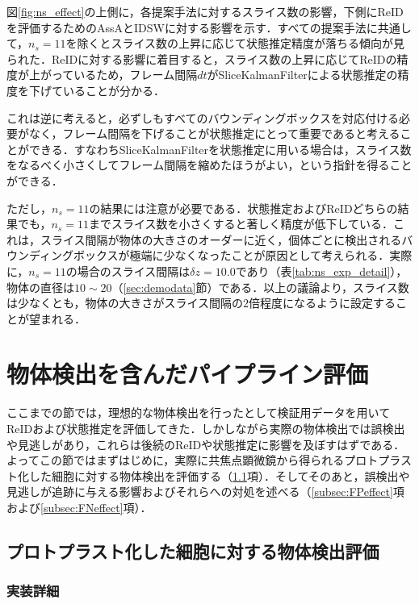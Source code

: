     図\ref{fig:ns_effect}の上側に，各提案手法に対するスライス数の影響，下側にReIDを評価するためのAssAとIDSWに対する影響を示す．すべての提案手法に共通して，$n_s = 11$を除くとスライス数の上昇に応じて状態推定精度が落ちる傾向が見られた．ReIDに対する影響に着目すると，スライス数の上昇に応じてReIDの精度が上がっているため，フレーム間隔$dt$がSliceKalmanFilterによる状態推定の精度を下げていることが分かる．

    これは逆に考えると，必ずしもすべてのバウンディングボックスを対応付ける必要がなく，フレーム間隔を下げることが状態推定にとって重要であると考えることができる．すなわちSliceKalmanFilterを状態推定に用いる場合は，スライス数をなるべく小さくしてフレーム間隔を縮めたほうがよい，という指針を得ることができる．

    ただし，$n_s = 11$の結果には注意が必要である．状態推定およびReIDどちらの結果でも，$n_s = 11$までスライス数を小さくすると著しく精度が低下している．これは，スライス間隔が物体の大きさのオーダーに近く，個体ごとに検出されるバウンディングボックスが極端に少なくなったことが原因として考えられる．実際に，$n_s = 11$の場合のスライス間隔は$\delta z = 10.0$であり（表\ref{tab:ns_exp_detail}），物体の直径は$10 \sim 20$（\ref{sec:demodata}節）である．以上の議論より，スライス数は少なくとも，物体の大きさがスライス間隔の$2$倍程度になるように設定することが望まれる．

\section{物体検出を含んだパイプライン評価}
\label{sec:pipleline_evaluation_with_detection}

ここまでの節では，理想的な物体検出を行ったとして検証用データを用いてReIDおよび状態推定を評価してきた．しかしながら実際の物体検出では誤検出や見逃しがあり，これらは後続のReIDや状態推定に影響を及ぼすはずである．よってこの節ではまずはじめに，実際に共焦点顕微鏡から得られるプロトプラスト化した細胞に対する物体検出を評価する（\ref{subsec:detection_of_protoplast}項）．そしてそのあと，誤検出や見逃しが追跡に与える影響およびそれらへの対処を述べる（\ref{subsec:FPeffect}項および\ref{subsec:FNeffect}項）．

    \subsection{プロトプラスト化した細胞に対する物体検出評価}
    \label{subsec:detection_of_protoplast}

    \subsubsection{実装詳細}

